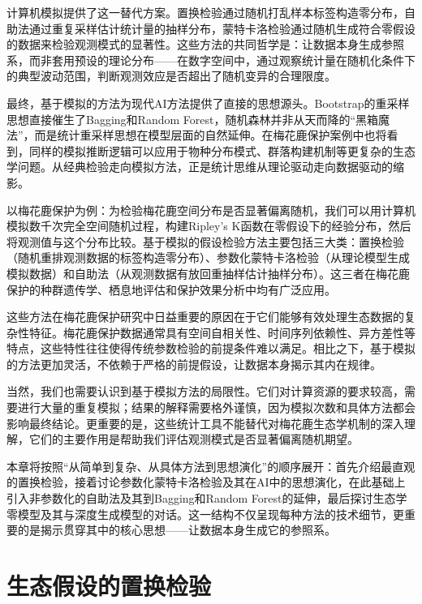 \documentclass[
  twoside,12pt,fontset=none]{ctexbook}
\begin{document}
计算机模拟提供了这一替代方案。置换检验通过随机打乱样本标签构造零分布，自助法通过重复采样估计统计量的抽样分布，蒙特卡洛检验通过随机生成符合零假设的数据来检验观测模式的显著性。这些方法的共同哲学是：让数据本身生成参照系，而非套用预设的理论分布------在数字空间中，通过观察统计量在随机化条件下的典型波动范围，判断观测效应是否超出了随机变异的合理限度。

最终，基于模拟的方法为现代AI方法提供了直接的思想源头。Bootstrap的重采样思想直接催生了Bagging和Random Forest，随机森林并非从天而降的``黑箱魔法''，而是统计重采样思想在模型层面的自然延伸。在梅花鹿保护案例中也将看到，同样的模拟推断逻辑可以应用于物种分布模式、群落构建机制等更复杂的生态学问题。从经典检验走向模拟方法，正是统计思维从理论驱动走向数据驱动的缩影。

以梅花鹿保护为例：为检验梅花鹿空间分布是否显著偏离随机，我们可以用计算机模拟数千次完全空间随机过程，构建Ripley's K函数在零假设下的经验分布，然后将观测值与这个分布比较。基于模拟的假设检验方法主要包括三大类：置换检验（随机重排观测数据的标签构造零分布）、参数化蒙特卡洛检验（从理论模型生成模拟数据）和自助法（从观测数据有放回重抽样估计抽样分布）。这三者在梅花鹿保护的种群遗传学、栖息地评估和保护效果分析中均有广泛应用。

这些方法在梅花鹿保护研究中日益重要的原因在于它们能够有效处理生态数据的复杂性特征。梅花鹿保护数据通常具有空间自相关性、时间序列依赖性、异方差性等特点，这些特性往往使得传统参数检验的前提条件难以满足。相比之下，基于模拟的方法更加灵活，不依赖于严格的前提假设，让数据本身揭示其内在规律。

当然，我们也需要认识到基于模拟方法的局限性。它们对计算资源的要求较高，需要进行大量的重复模拟；结果的解释需要格外谨慎，因为模拟次数和具体方法都会影响最终结论。更重要的是，这些统计工具不能替代对梅花鹿生态学机制的深入理解，它们的主要作用是帮助我们评估观测模式是否显著偏离随机期望。

本章将按照``从简单到复杂、从具体方法到思想演化''的顺序展开：首先介绍最直观的置换检验，接着讨论参数化蒙特卡洛检验及其在AI中的思想演化，在此基础上引入非参数化的自助法及其到Bagging和Random Forest的延伸，最后探讨生态学零模型及其与深度生成模型的对话。这一结构不仅呈现每种方法的技术细节，更重要的是揭示贯穿其中的核心思想------让数据本身生成它的参照系。

\hypertarget{ux751fux6001ux5047ux8bbeux7684ux7f6eux6362ux68c0ux9a8c}{%
\section{生态假设的置换检验}\label{ux751fux6001ux5047ux8bbeux7684ux7f6eux6362ux68c0ux9a8c}}
\end{document}
